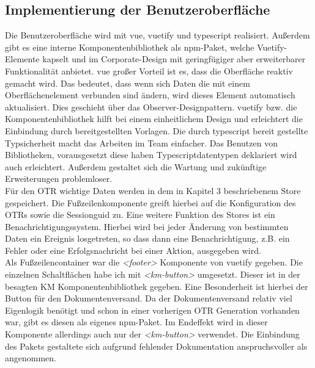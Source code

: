 \subsection{Implementierung der Benutzeroberfläche}
\label{oberflacheimplemetieren}
Die Benutzeroberfläche wird mit \gls{vue}, \gls{vuetify} und \gls{typescript} realisiert. Außerdem gibt es eine interne Komponentenbibliothek als \gls{npm}-Paket, welche Vuetify-Elemente kapselt und im Corporate-Design mit geringfügiger aber erweiterbarer Funktionalität anbietet. \gls{vue} großer Vorteil ist es, dass die Oberfläche reaktiv gemacht wird. Das bedeutet, dass wenn sich Daten die mit einem Oberflächenelement verbunden sind ändern, wird dieses Element automatisch aktualisiert. Dies geschieht über das Observer-Designpattern. \gls{vuetify} bzw. die Komponentenbibliothek hilft bei einem einheitlichem Design und erleichtert die Einbindung durch bereitgestellten Vorlagen. Die durch \gls{typescript} bereit gestellte Typsicherheit macht das Arbeiten im Team einfacher. Das Benutzen von Bibliotheken, vorausgesetzt diese haben Typescriptdatentypen deklariert wird auch erleichtert. Außerdem gestaltet sich die Wartung und zukünftige Erweiterungen problemloser.\\
Für den \ac{OTR} wichtige Daten werden in dem in Kapitel 3 beschriebenem Store gespeichert. Die Fußzeilenkomponente greift hierbei auf die Konfiguration des \ac{OTR}s sowie die Sessionguid zu.
Eine weitere Funktion des Stores ist ein Benachrichtigungssystem. Hierbei wird bei jeder Änderung von bestimmten Daten ein Ereignis losgetreten, so dass dann eine Benachrichtigung, z.B. ein Fehler oder eine Erfolgsnachricht bei einer Aktion, ausgegeben wird.\\
Als Fußzeilencontainer war die \textit{<footer>} Komponente von \gls{vuetify} gegeben. Die einzelnen Schaltflächen habe ich mit \textit{<km-button>} umgesetzt. Dieser ist in der besagten \ac{KM} Komponentenbibliothek gegeben. Eine Besonderheit ist hierbei der Button für den Dokumentenversand. Da der Dokumentenversand relativ viel Eigenlogik benötigt und schon in einer vorherigen \ac{OTR} Generation vorhanden war, gibt es diesen als eigenes \gls{npm}-Paket. Im Endeffekt wird in dieser Komponente allerdings auch nur der \textit{<km-button>} verwendet. Die Einbindung des Pakets gestaltete sich aufgrund fehlender Dokumentation anspruchsvoller als angenommen.\\

